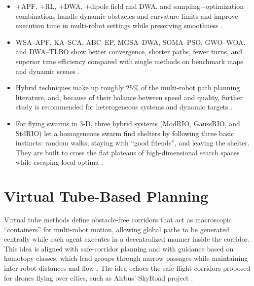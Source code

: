 \begin{itemize}
  \item {} \Astar+APF, \Astar+RL,
        \Astar+DWA, \Thetastar+dipole field and DWA, and sampling+optimization
        combinations handle dynamic obstacles and curvature limits and improve
        execution time in multi-robot settings while preserving smoothness
        \cite{abujabal2024path}.
  \item {} WSA--APF, KA--SCA, ABC--EP,
        MGSA--DWA, SOMA--PSO, GWO--WOA, and DWA--TLBO show better convergence,
        shorter paths, fewer turns, and superior time efficiency compared with
        single methods on benchmark maps and dynamic scenes \cite{abujabal2024path}.
  \item {} Hybrid techniques make up roughly 25\% of the
        multi-robot path planning literature, and, because of their balance
        between speed and quality, further study is recommended for
        heterogeneous systems and dynamic targets \cite{abujabal2024path}.
  \item {} For flying swarms in 3-D, three hybrid systems
        (ModRIO, GaussRIO, and StdRIO) let a homogeneous swarm find shelters by
        following three basic instincts: random walks, staying with ``good
        friends'', and leaving the shelter. They are built to cross the flat
        plateaus of high-dimensional search spaces while escaping local optima
        \cite{tan2016handbook}.
\end{itemize}

\section{Virtual Tube-Based Planning}\label{sec:virtual-tube}

Virtual tube methods define obstacle-free corridors that act as macroscopic
``containers'' for multi-robot motion, allowing global paths to be generated
centrally while each agent executes in a decentralized manner inside the
corridor. This idea is aligned with safe-corridor planning and with guidance based
on homotopy classes, which lead groups through narrow passages while maintaining
inter-robot distances and flow \cite{mao2023optimal}. The idea echoes the safe
flight corridors proposed for drones flying over cities, such as Airbus'
SkyRoad project \cite{mao2023optimal}.

